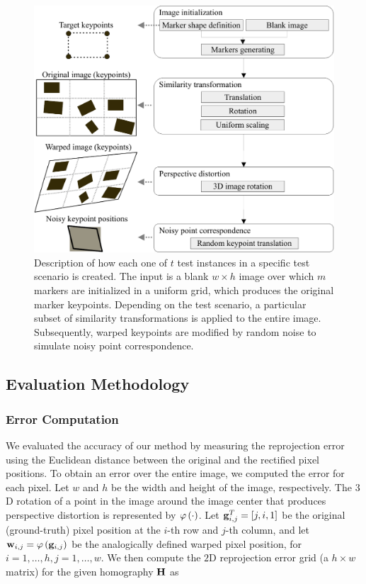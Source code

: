 \begin{figure}[t]
    \centering
    \includegraphics[width=0.7\linewidth]{figures/homography/dataset_generating.pdf}
    \caption{Description of how each one of $t$ test instances in a specific test scenario is created. The input is a blank $w \times h$ image over which $m$ markers are initialized in a uniform grid, which produces the original marker keypoints. Depending on the test scenario, a particular subset of similarity transformations is applied to the entire image. Subsequently, warped keypoints are modified by random noise to simulate noisy point correspondence.}
    \label{fig:DatasetGenerating}
\end{figure}

\subsection{Evaluation Methodology}
\label{ssec:evaluation_methodology}

\subsubsection{Error Computation}
\label{sssec:error_computation}

\def\warpedpix{\vect{w}}
\def\origpix{\vect{g}}

We evaluated the accuracy of our method by measuring the reprojection error using the Euclidean distance between the original and the rectified pixel positions. To obtain an error over the entire image, we computed the error for each pixel. Let $w$ and $h$ be the width and height of the image, respectively. The $3$D rotation of a point in the image around the image center that produces perspective distortion is represented by ${\varphi} \left( \cdot \right)$. Let $\subsup{\origpix}{i,j}{T} = \sbrackets{j, i, 1}$ be the original (ground-truth) pixel position at the $i$-th row and $j$-th column, and let $\warpedpix_{i, j} = \func{\varphi}{\origpix_{i, j}}$ be the analogically defined warped pixel position, for $i = 1, \dots, h, j = 1, \dots, w$. We then compute the $2$D reprojection error grid (a $h \times w$ matrix) for the given homography $\mathbf{H}$ as

